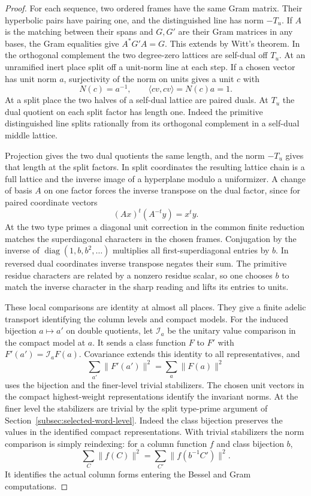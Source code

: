 \begin{proof}
For each sequence, two ordered frames have the same Gram matrix.
Their hyperbolic pairs have pairing one, and the distinguished
line has norm \(-T_u\). If \(A\) is the matching between their spans and \(G,G'\)
are their Gram matrices in any bases, the Gram equalities give
\(A^*G'A=G\). This extends by Witt's theorem. In the
orthogonal complement the two degree-zero lattices are
self-dual off \(T_u\). At an unramified inert place split off a unit-norm line at each step. If a chosen vector has unit norm \(a\), surjectivity of the norm on units gives a unit \(c\) with
\[
 N(c)=a^{-1},\qquad \langle cv,cv\rangle=N(c)a=1 .
\] At a split place the two halves of a self-dual
lattice are paired duals. At \(T_u\) the dual quotient on
each split factor has length one. Indeed the primitive
distinguished line splits rationally from its orthogonal
complement in a self-dual middle lattice.

Projection gives
the two dual quotients the same length, and the norm
\(-T_u\) gives that length at the split factors. In split
coordinates the resulting lattice chain is a full lattice
and the inverse image of a hyperplane modulo a uniformizer.
A change of basis \(A\) on one factor forces the inverse transpose on the dual factor, since for paired coordinate vectors
\[
 (Ax)^t(A^{-t}y)=x^ty .
\] At the two type
primes a diagonal unit correction in the common finite
reduction matches the superdiagonal characters in the
chosen frames. Conjugation by the inverse of
\(\operatorname{diag}(1,b,b^2,\ldots)\) multiplies all
first-superdiagonal entries by \(b\). In reversed dual
coordinates inverse transpose negates their sum. The
primitive residue characters are related by a nonzero
residue scalar, so one chooses \(b\) to match the inverse
character in the sharp reading and lifts its entries to units.

These local comparisons are identity at almost all places.
They give a finite adelic transport identifying the
column levels and compact models. For the induced bijection
\(a\mapsto a'\) on double quotients, let \(\mathcal I_a\) be the
unitary value comparison in the compact model at \(a\). It sends a
class function \(F\) to \(F'\) with \(F'(a')=\mathcal I_a F(a)\).
Covariance extends this identity to all representatives, and
\[
          \sum_{a'}\|F'(a')\|^2=\sum_a\|F(a)\|^2
\]
uses the bijection and the finer-level trivial stabilizers. The chosen unit vectors in the compact
highest-weight representations identify the invariant
norms. At the finer level the stabilizers are trivial by
the split type-prime argument of
Section~\ref{subsec:selected-word-level}. Indeed the class bijection preserves the values in the identified compact representations. With trivial stabilizers the norm comparison is simply reindexing: for a column function \(f\) and class bijection \(b\),
\[
 \sum_C\|f(C)\|^2=\sum_{C'}\|f(b^{-1}C')\|^2 .
\] It identifies the actual column forms
entering the Bessel and Gram computations.


\end{proof}
